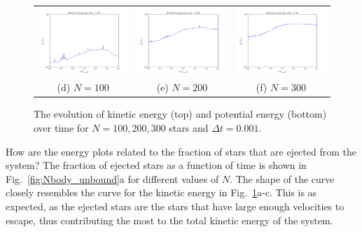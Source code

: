\documentclass{article}
\begin{document}
\begin{multicols}{2}
\begin{figure}[t!]
\begin{center}
\begin{tabular}{ccc}
	  \includegraphics[width=60mm]{Images/Ep_100stars.png}
	& \includegraphics[width=60mm]{Images/Ep_200stars.png}
	& \includegraphics[width=60mm]{Images/Ep_300stars.png} \\
	(d) $N = 100$		& (e) $N = 200$  	& (f) $N = 300$ \\[6pt]
\end{tabular}
\caption{The evolution of kinetic energy (top) and potential energy (bottom) over time for $N = 100, 200, 300$ stars and $\Delta t = 0.001$.}\label{fig:Nbody_energy}
\end{center}
\end{figure}
How are the energy plots related to the fraction of stars that are ejected from the system? The fraction of ejected stars as a function of time is shown in Fig.~\ref{fig:Nbody_unbound}a for different values of $N$. The shape of the curve closely resembles the curve for the kinetic energy in Fig.~\ref{fig:Nbody_energy}a-c. This is as expected, as the ejected stars are the stars that have large enough velocities to escape, thus contributing the most to the total kinetic energy of the system. 


\end{multicols}
\end{document}
